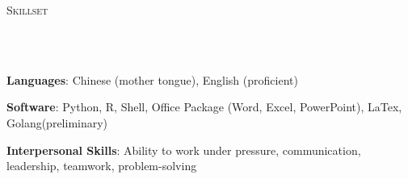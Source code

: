 \documentclass{article}
\newcommand{\header}[1]{{
\hspace*{-15pt}\vspace*{6pt} \textsc{#1}} \vspace*{-6pt} 
\lineunder
}
\newcommand{\lineunder}{
\vspace*{-8pt} \\ \hspace*{-18pt} 
\hrulefill \\
}
\renewcommand{\labelitemii}{
$\vcenter{\hbox{\tiny$\bullet$}}$\hspace*{-3pt}
}
\newenvironment{bullet-list-major}{
\begin{list}{\labelitemii}{\setlength\leftmargin{3pt} 
\topsep 0pt \itemsep -2pt}}{\vspace*{4pt}\end{list}
}
\begin{document}
    
\vspace*{4pt}%
\header{Skillset}
    \begin{bullet-list-major}
    \item \textbf{Languages}: Chinese (mother tongue), English (proficient)
    \vspace{2pt}
    \item \textbf{Software}: Python, R, Shell, Office Package (Word, Excel, PowerPoint), LaTex, Golang(preliminary)
    \vspace{2pt}
    \item \textbf{Interpersonal Skills}: Ability to work under pressure, communication, leadership, teamwork, problem-solving
    \end{bullet-list-major}
\end{document}
